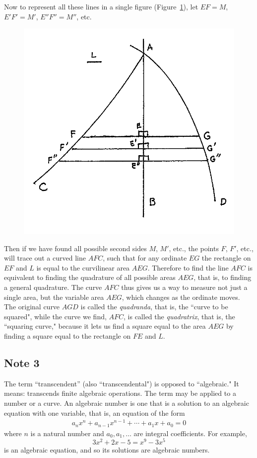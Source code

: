 \documentclass[twoside,openright]{article}
\begin{document}
Now to represent all these lines in a single figure
(Figure~\ref{quadratrix}), let $EF = M$, $E'F' = M'$, $E''F'' = M''$,
etc.
\begin{figure}[htp]
\begin{center}
\includegraphics[width=.75\textwidth]{fig/Figure29C}
\caption{}
\label{quadratrix}
\vspace{-10pt}
\end{center}
\end{figure} 
Then if we have found all possible second sides $M$, $M'$, etc., the
points $F$, $F'$, etc., will trace out a curved line $AFC$, such that
for any ordinate $EG$ the rectangle on $EF$ and $L$ is equal to the
curvilinear area $AEG$.  Therefore to find the line $AFC$ is
equivalent to finding the quadrature of all possible areas $AEG$, that
is, to finding a general quadrature.  The curve $AFC$ thus gives us a
way to measure not just a single area, but the variable area $AEG$,
which changes as the ordinate moves.  The original curve $AGD$ is
called the {\em quadranda}, that is, the ``curve to be squared", while
the curve we find, $AFC$, is called the {\em
  quadratrix}\label{quaddef}, that is, the ``squaring curve," because
it lets us find a square equal to the area $AEG$ by finding a square
equal to the rectangle on $FE$ and $L$.

\subsection*{Note 3}
\label{crg3}
The term ``transcendent'' (also ``transcendental") is opposed to
``algebraic." It means: transcends finite algebraic operations. The
term may be applied to a number or a curve. An algebraic
number is one that is a solution to an algebraic equation with one
variable, that is, an equation of the form
\begin{align*}
a_{n}x^n+a_{n-1}x^{n-1}+\cdots+a_1x+a_0=0
\end{align*}
where $n$ is a natural number and $a_0, a_1, \dotsc$ are integral coefficients.
For example,
$$3x^2 + 2x -5  = x^9 - 3x^5$$
is an algebraic equation, and so its solutions are algebraic numbers.
\end{document}
